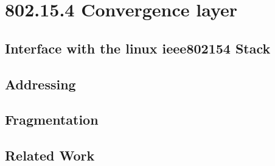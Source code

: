 \chapter{802.15.4 Convergence layer}
\label{802154layer}
\section{Interface with the linux ieee802154 Stack}
\section{Addressing}
\section{Fragmentation}
\section{Related Work}
